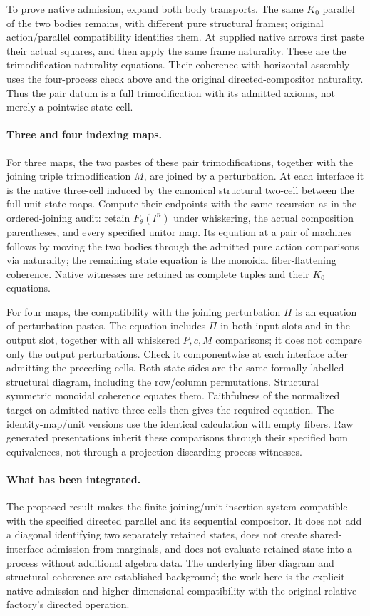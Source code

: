 \documentclass{article}
\begin{document}
To prove native admission, expand both body transports. The same $K_0$ parallel of the two bodies remains, with different pure structural frames; original action/parallel compatibility identifies them. At supplied native arrows first paste their actual squares, and then apply the same frame naturality. These are the trimodification naturality equations. Their coherence with horizontal assembly uses the four-process check above and the original directed-compositor naturality. Thus the pair datum is a full trimodification with its admitted axioms, not merely a pointwise state cell.

\paragraph{Three and four indexing maps.} For three maps, the two pastes of these pair trimodifications, together with the joining triple trimodification $M$, are joined by a perturbation. At each interface it is the native three-cell induced by the canonical structural two-cell between the full unit-state maps. Compute their endpoints with the same recursion as in the ordered-joining audit: retain $F_\theta(I^n)$ under whiskering, the actual composition parentheses, and every specified unitor map. Its equation at a pair of machines follows by moving the two bodies through the admitted pure action comparisons via naturality; the remaining state equation is the monoidal fiber-flattening coherence. Native witnesses are retained as complete tuples and their $K_0$ equations.

For four maps, the compatibility with the joining perturbation $\Pi$ is an equation of perturbation pastes. The equation includes $\Pi$ in both input slots and in the output slot, together with all whiskered $P,c,M$ comparisons; it does not compare only the output perturbations. Check it componentwise at each interface after admitting the preceding cells. Both state sides are the same formally labelled structural diagram, including the row/column permutations. Structural symmetric monoidal coherence equates them. Faithfulness of the normalized target on admitted native three-cells then gives the required equation. The identity-map/unit versions use the identical calculation with empty fibers. Raw generated presentations inherit these comparisons through their specified hom equivalences, not through a projection discarding process witnesses.

\paragraph{What has been integrated.} The proposed result makes the finite joining/unit-insertion system compatible with the specified directed parallel and its sequential compositor. It does not add a diagonal identifying two separately retained states, does not create shared-interface admission from marginals, and does not evaluate retained state into a process without additional algebra data. The underlying fiber diagram and structural coherence are established background; the work here is the explicit native admission and higher-dimensional compatibility with the original relative factory's directed operation.
\end{document}
